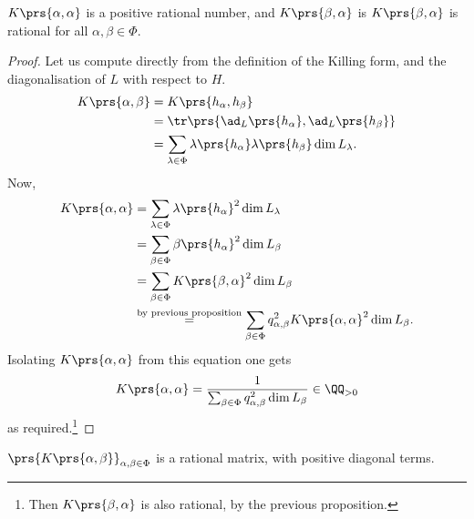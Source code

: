 \documentclass[10pt,a4paper,twoside,openany,hidelinks]{book}
\begin{document}
\begin{proposition}
$K\prs{\alpha,\alpha}$ is a positive rational number, and $K\prs{\beta,\alpha}$ is $K\prs{\beta,\alpha}$ is rational for all $\alpha,\beta\in\Phi$.
\end{proposition}
\begin{proof}
Let us compute directly from the definition of the Killing form, and the diagonalisation of $L$ with respect to $H$.
\begin{align*}
K\prs{\alpha,\beta} &= K\prs{h_{\alpha}, h_{\beta}} \\&= \tr\prs{\ad_L\prs{h_{\alpha}}, \ad_L\prs{h_{\beta}}} \\&=
\sum_{\lambda \in \Phi} \lambda\prs{h_{\alpha}} \lambda\prs{h_{\beta}} \dim L_{\lambda} \text{.}
\end{align*}
Now,
\begin{align*}
K\prs{\alpha,\alpha} &= \sum_{\lambda \in \Phi} \lambda\prs{h_{\alpha}}^2 \dim L_{\lambda} \\&= \sum_{\beta \in \Phi} \beta\prs{h_{\alpha}}^2 \dim L_{\beta} \\&= \sum_{\beta \in \Phi} K\prs{\beta,\alpha}^2 \dim L_{\beta} \\ &\stackrel{\text{by previous proposition}}{=} \sum_{\beta \in \Phi} q_{\alpha,\beta}^2 K\prs{\alpha,\alpha}^2 \dim L_{\beta} \text{.}
\end{align*}
Isolating $K\prs{\alpha,\alpha}$ from this equation one gets
\[K\prs{\alpha,\alpha} = \frac{1}{\sum_{\beta \in \Phi} q_{\alpha,\beta}^2 \dim L_{\beta}} \in \QQ_{>0}\]
as required.\footnote{Then $K\prs{\beta,\alpha}$ is also rational, by the previous proposition.}
\end{proof}
\begin{corollary}
$\prs{K\prs{\alpha,\beta}}_{\alpha,\beta \in \Phi}$ is a rational matrix, with positive diagonal terms.
\end{corollary}
\end{document}

